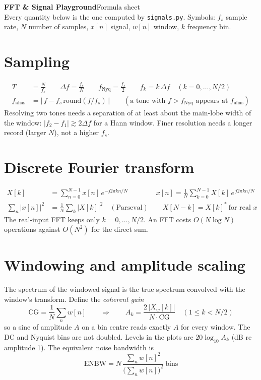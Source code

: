 \documentclass[10pt,a4paper]{article}
\newcommand{\bin}{\Delta f}
\begin{document}
{\LARGE\bfseries\color{ac} FFT \& Signal Playground}\hfill{\large Formula sheet}\\[-2pt]
{\small\color{gray} Every quantity below is the one computed by \texttt{signals.py}. Symbols: $f_s$ sample rate, $N$ number of samples, $x[n]$ signal, $w[n]$ window, $k$ frequency bin.}

\section{Sampling}
\begin{align*}
T &= \frac{N}{f_s} \qquad
\bin = \frac{f_s}{N} \qquad
f_{\mathrm{Nyq}} = \frac{f_s}{2} \qquad
f_k = k\,\bin \quad (k = 0,\dots,N/2)\\[2pt]
f_{\mathrm{alias}} &= \bigl|\,f - f_s \,\mathrm{round}(f/f_s)\,\bigr| \qquad (\text{a tone with } f > f_{\mathrm{Nyq}} \text{ appears at } f_{\mathrm{alias}})
\end{align*}
Resolving two tones needs a separation of at least about the main-lobe width of the window: $|f_2 - f_1| \gtrsim 2\bin$ for a Hann window. Finer resolution needs a longer record (larger $N$), not a higher $f_s$.

\section{Discrete Fourier transform}
\begin{align*}
X[k] &= \sum_{n=0}^{N-1} x[n]\,e^{-j 2\pi k n/N}
\qquad\qquad
x[n] = \frac{1}{N}\sum_{k=0}^{N-1} X[k]\,e^{\,j 2\pi k n/N}\\
\sum_{n} |x[n]|^2 &= \frac{1}{N}\sum_{k} |X[k]|^2 \quad(\text{Parseval})
\qquad
X[N-k] = X[k]^{*}\ \text{for real } x
\end{align*}
The real-input FFT keeps only $k = 0,\dots,N/2$. An FFT costs $O(N\log N)$ operations against $O(N^2)$ for the direct sum.

\section{Windowing and amplitude scaling}
The spectrum of the windowed signal is the true spectrum convolved with the window's transform. Define the \emph{coherent gain}
\[
\mathrm{CG} = \frac{1}{N}\sum_{n} w[n]
\qquad\Longrightarrow\qquad
A_k = \frac{2\,|X_w[k]|}{N\cdot\mathrm{CG}} \quad (1 \le k < N/2)
\]
so a sine of amplitude $A$ on a bin centre reads exactly $A$ for every window. The DC and Nyquist bins are not doubled. Levels in the plots are
$20\log_{10}A_k$ (dB re amplitude 1). The equivalent noise bandwidth is
\[
\mathrm{ENBW} = N\,\frac{\sum_n w[n]^2}{\bigl(\sum_n w[n]\bigr)^2}\ \text{bins}
\]
\end{document}
